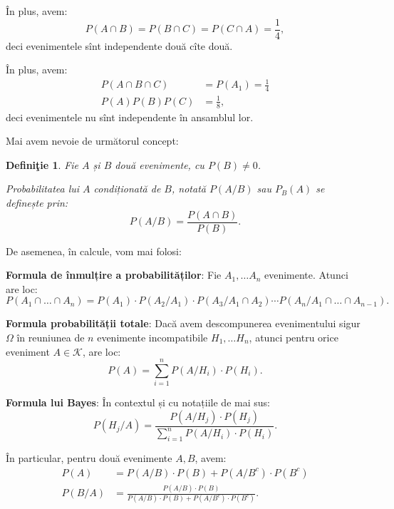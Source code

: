 \documentclass[12pt,a4paper]{article}
\newcommand\kal{\mathcal}
\theoremstyle{dotless}
\theoremstyle{dotlessdr}
\newtheorem{definition}{Defini\c{t}ie}
\begin{document}
În plus, avem:
\[
  P(A \cap B) = P(B \cap C) = P(C \cap A) = \frac{1}{4},
\]
deci evenimentele sînt independente două cîte două.

În plus, avem:
\begin{align*}
  P(A \cap B \cap C) &= P(A_1) = \frac{1}{4} \\
  P(A)P(B)P(C) &= \frac{1}{8},
\end{align*}
deci evenimentele nu sînt independente în ansamblul lor.

\vspace{1cm}

Mai avem nevoie de următorul concept:

\begin{definition}\label{def:p-cond}
  Fie $ A $ și $ B $ două evenimente, cu $ P(B) \neq 0 $.

  \emph{Probabilitatea lui $ A $ condiționată de $ B $}, notată $ P(A/B) $ sau
  $ P_B(A) $ se definește prin:
  \[
    P(A/B) = \frac{P(A \cap B)}{P(B)}.
  \]
\end{definition}

De asemenea, în calcule, vom mai folosi:

\textbf{Formula de înmulțire a probabilităților}: Fie $ A_1, \dots A_n $ evenimente.
Atunci are loc:
\[
  P(A_1 \cap \dots \cap A_n) = P(A_1) \cdot P(A_2/A_1) \cdot P(A_3/A_1 \cap A_2) \cdots %
  P(A_n/A_1 \cap \dots \cap A_{n-1}).
\]

\vspace{1cm}

\textbf{Formula probabilității totale}: Dacă avem descompunerea evenimentului sigur
$ \Omega $ în reuniunea de $ n $ evenimente incompatibile $ H_1, \dots H_n $, atunci
pentru orice eveniment $ A \in \kal{K} $, are loc:
\[
  P(A) = \sum_{i = 1}^n P(A/H_i) \cdot P(H_i).
\]

\vspace{1cm}

\textbf{Formula lui Bayes}: În contextul și cu notațiile de mai sus:
\[
  P(H_j/A) = \frac{P(A/H_j) \cdot P(H_j)}{\sum_{i = 1}^n P(A/H_i) \cdot P(H_i)}.
\]

În particular, pentru două evenimente $ A, B $, avem:
\begin{align*}
  P(A) &= P(A/B) \cdot P(B) + P(A/B^c)\cdot P(B^c) \\
  P(B/A) &= \frac{P(A/B) \cdot P(B)}{P(A/B) \cdot P(B) + P(A/B^c) \cdot P(B^c)}.
\end{align*}

\end{document}
